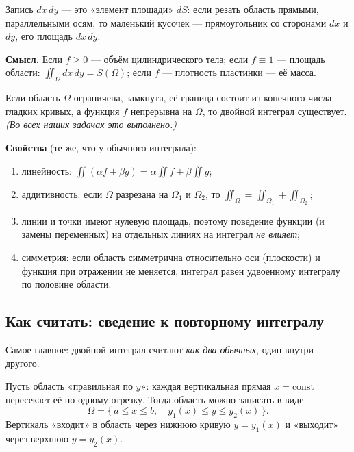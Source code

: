 Запись $dx\,dy$ --- это «элемент площади» $dS$: если резать область прямыми, параллельными осям, то маленький кусочек --- прямоугольник со сторонами $dx$ и $dy$, его площадь $dx\,dy$.

\textbf{Смысл.} Если $f\geqslant0$ --- объём цилиндрического тела; если $f\equiv1$ --- площадь области: $\iint_\Omega dx\,dy=S(\Omega)$; если $f$ --- плотность пластинки --- её масса.

\begin{thmbox}[\ (существование)]
Если область $\Omega$ ограничена, замкнута, её граница состоит из конечного числа гладких кривых, а функция $f$ непрерывна на $\Omega$, то двойной интеграл существует. \emph{(Во всех наших задачах это выполнено.)}
\end{thmbox}

\textbf{Свойства} (те же, что у обычного интеграла):
\begin{enumerate}[label=\arabic*)]
\item линейность: $\iint(\alpha f+\beta g)=\alpha\iint f+\beta\iint g$;
\item аддитивность: если $\Omega$ разрезана на $\Omega_1$ и $\Omega_2$, то $\iint_\Omega=\iint_{\Omega_1}+\iint_{\Omega_2}$;
\item линии и точки имеют нулевую площадь, поэтому поведение функции (и замены переменных) на отдельных линиях на интеграл \emph{не влияет};
\item симметрия: если область симметрична относительно оси (плоскости) и функция при отражении не меняется, интеграл равен удвоенному интегралу по половине области.
\end{enumerate}

\subsection{Как считать: сведение к повторному интегралу}

Самое главное: двойной интеграл считают \emph{как два обычных}, один внутри другого.

Пусть область «правильная по $y$»: каждая вертикальная прямая $x=\mathrm{const}$ пересекает её по одному отрезку. Тогда область можно записать в виде
\[
\Omega=\{\,a\leqslant x\leqslant b,\quad y_1(x)\leqslant y\leqslant y_2(x)\,\}.
\]
Вертикаль «входит» в область через нижнюю кривую $y=y_1(x)$ и «выходит» через верхнюю $y=y_2(x)$.

